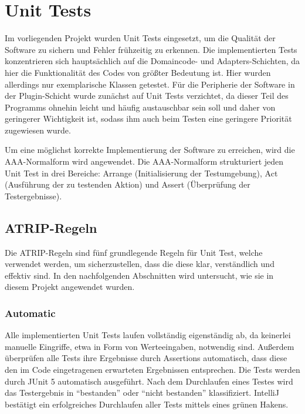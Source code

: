\chapter{Unit Tests}

Im vorliegenden Projekt wurden Unit Tests eingesetzt, um die Qualität der Software zu sichern und Fehler frühzeitig zu erkennen. Die implementierten Tests konzentrieren sich hauptsächlich auf die Domaincode- und Adapters-Schichten, da hier die Funktionalität des Codes von größter Bedeutung ist. Hier wurden allerdings nur exemplarische Klassen getestet. Für die Peripherie der Software in der Plugin-Schicht wurde zunächst auf Unit Tests verzichtet, da dieser Teil des Programms ohnehin leicht und häufig austauschbar sein soll und daher von geringerer Wichtigkeit ist, sodass ihm auch beim Testen eine geringere Priorität zugewiesen wurde.

Um eine möglichst korrekte Implementierung der Software zu erreichen, wird die AAA-Normalform wird angewendet. Die AAA-Normalform strukturiert jeden Unit Test in drei Bereiche: Arrange (Initialisierung der Testumgebung), Act (Ausführung der zu testenden Aktion) und Assert (Überprüfung der Testergebnisse).

\section{ATRIP-Regeln}

Die ATRIP-Regeln sind fünf grundlegende Regeln für Unit Test, welche verwendet werden, um sicherzustellen, dass die diese klar, verständlich und effektiv sind. In den nachfolgenden Abschnitten wird untersucht, wie sie in diesem Projekt angewendet wurden.

\subsection{Automatic}

Alle implementierten Unit Tests laufen vollständig eigenständig ab, da keinerlei manuelle Eingriffe, etwa in Form von Werteeingaben, notwendig sind. Außerdem überprüfen alle Tests ihre Ergebnisse durch Assertions automatisch, dass diese den im Code eingetragenen erwarteten Ergebnissen entsprechen. Die Tests werden durch JUnit 5 automatisch ausgeführt. Nach dem Durchlaufen eines Testes wird das Testergebnis in \enquote{bestanden} oder \enquote{nicht bestanden} klassifiziert. IntelliJ bestätigt ein erfolgreiches Durchlaufen aller Tests mittels eines grünen Hakens.

